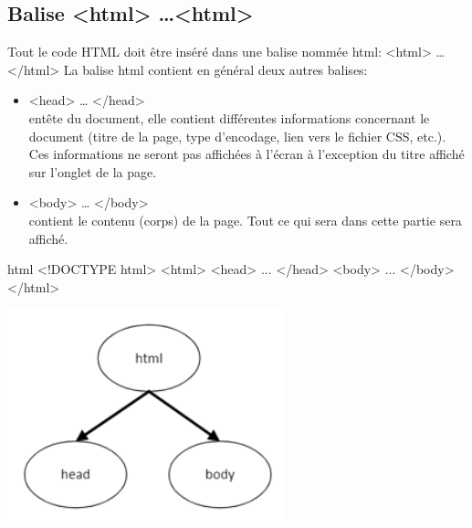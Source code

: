 \documentclass[a4paper,11pt]{article}
\begin{document}
\subsection{Balise <html> \dots <html>}
Tout le code HTML doit être inséré dans une balise nommée html: <html> … </html>
La balise html contient en général deux autres balises:
\begin{itemize}
\item <head> … </head>\\
entête du document, elle contient différentes informations concernant le document (titre de la page, type d'encodage, lien vers le fichier CSS, etc.).
Ces informations ne seront pas affichées à l'écran à l'exception du titre affiché sur l'onglet de la page.
\item <body> … </body>\\
contient le contenu (corps) de la page. Tout ce qui sera dans cette partie sera affiché.
\end{itemize}
\begin{multicols}{2}
\begin{code}{html}
<!DOCTYPE html>
<html>
  <head>
   ...
  </head>
  <body>
   ...
  </body>
</html>
\end{code}
\includegraphics[width=0.6\textwidth]{images/balise-html.png} \\
\end{multicols}

\newpage
\end{document}
